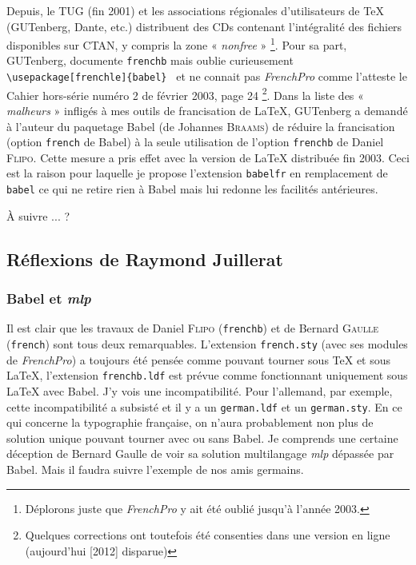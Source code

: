 \documentclass[a4paper,12pt,openright]{article}
\begin{document}
Depuis, le TUG (fin 2001) et les associations régionales d’utilisateurs de
\TeX{} (GUTenberg, Dante, etc.) distribuent des CDs contenant l’intégralité des
fichiers disponibles sur CTAN, y compris la zone « \textit{nonfree} » %
\footnote{ Déplorons juste que \textsl{FrenchPro} y ait été oublié jusqu’à l’année 2003.}. 
Pour sa part, GUTenberg, documente \texttt{frenchb} mais oublie curieusement
\texttt{{\backslash}usepackage[frenchle]\{babel\} }
et ne connait pas \textsl{FrenchPro} comme l’atteste
le Cahier hors-série numéro 2 de février 2003, page 24%
\footnote{Quelques corrections ont toutefois été consenties dans une version en ligne
(aujourd'hui [2012] disparue) }.
Dans la liste des « \textit{malheurs} » infligés à mes outils de francisation de \LaTeX,
GUTenberg a demandé à l’auteur du paquetage Babel (de Johannes \textsc{Braams})
de réduire la francisation (option \texttt{french} de Babel) à la seule utilisation de
l’option \texttt{frenchb} de Daniel \textsc{Flipo}. 
Cette mesure a pris effet avec la version
de \LaTeX{} distribuée fin 2003. Ceci est la raison pour laquelle je propose l’extension
\texttt{babelfr} en remplacement 
de \texttt{babel} ce qui ne retire rien à Babel mais lui
redonne les facilités antérieures.

À suivre ... ?

\subsection{Réflexions de Raymond Juillerat}
\subsubsection{Babel et \textsl{mlp}}
Il est clair que les travaux de Daniel \textsc{Flipo} (\texttt{frenchb}) et de Bernard \textsc{Gaulle} (\texttt{french})
sont tous deux remarquables. L'extension \texttt{french.sty} 
(avec ses modules de \textsl{FrenchPro})
a toujours été pensée comme
pouvant tourner sous \TeX{} et sous \LaTeX, l'extension \texttt{frenchb.ldf} est prévue comme
fonctionnant uniquement sous \LaTeX{} avec 
Babel.
J'y vois une incompatibilité. Pour l'allemand, par exemple, cette incompatibilité a subsisté
et il y a un \texttt{german.ldf} et un \texttt{german.sty}.  En ce qui concerne la typographie française, on n'aura 
probablement non plus de solution unique pouvant tourner avec ou sans Babel. Je comprends une certaine 
déception de Bernard Gaulle de voir sa solution multilangage \textsl{mlp} dépassée par Babel.
Mais il faudra suivre l'exemple de nos amis germains.
\end{document}
